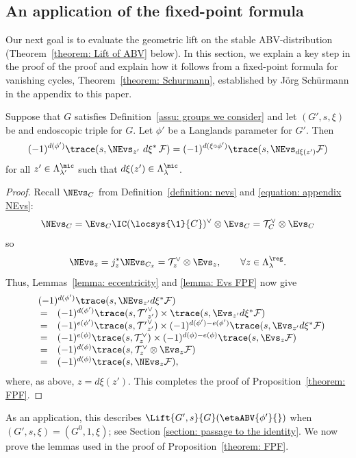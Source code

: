 \documentclass[11pt,letterpaper]{amsart}
\numberwithin{equation}{section}
\begin{document}
\subsection{An application of the fixed-point formula}\label{subsection: FPF}

Our next goal is to evaluate the geometric lift on the stable ABV-distribution (Theorem~\ref{theorem: Lift of ABV} below). In this section, we explain a key step in the proof of the proof and explain how it follows from a fixed-point formula for vanishing cycles, Theorem~\ref{theorem: Schurmann}, established by Jörg Schürmann in the appendix to this paper.

\begin{proposition}\label{theorem: FPF}
Suppose that $G$ satisfies Definition~\ref{assu: groups we consider} and let $(G',s,\xi)$ be and endoscopic triple for $G$.
Let $\phi'$ be a Langlands parameter for $G'$.
Then
\[
(-1)^{d(\phi')} \trace({s},\NEvs_{z'}\ d\xi^*\, \mathcal{F})
=
(-1)^{d(\xi\circ\phi')}
\trace({s},\NEvs_{d\xi(z')} \mathcal{F})
\] 
for all $z'\in \Lambda^\mic_{\lambda'}$ such that $d\xi(z')\in \Lambda^\mic_{\lambda}$.
\end{proposition}

\begin{proof}
Recall $\NEvs_{C}$ from Definition~\ref{definition: nevs} and \eqref{equation: appendix NEvs}:
\[
\NEvs_{C} = \Evs_{C}\IC(\locsys{\1}{C})^\vee \otimes \Evs_{C} = \mathcal{T}_{C}^\vee\otimes \Evs_{C}
\]
so
\[
\NEvs_{z} = j_{z}^* \NEvs_{C_x} = \mathcal{T}_{z}^\vee \otimes \Evs_{z}, 
\qquad
\forall z\in \Lambda^\reg_{\lambda}.
\]
Thus, Lemmas~\ref{lemma: eccentricity} and \ref{lemma: Evs FPF} now give
\[
\begin{array}{rcl}
&& \hskip-20pt (-1)^{d(\phi')}
\trace(s,\NEvs_{z'}d\xi^*\mathcal{F}) \\
&=&
(-1)^{d(\phi')}
\trace(s,\mathcal{T'}^\vee_{z'})\times \trace(s, \Evs_{z'} d\xi^*\mathcal{F})\\
&=&
(-1)^{e(\phi')}
\trace(s,\mathcal{T'}^\vee_{z'})\times 
(-1)^{d(\phi')-e(\phi')} \trace(s, \Evs_{z'} d\xi^*\mathcal{F})\\
&=&
(-1)^{e(\phi)}
\trace(s,\mathcal{T}^\vee_{z})\times 
(-1)^{d(\phi)-e(\phi)} \trace(s, \Evs_{z} \mathcal{F})\\
&=&
(-1)^{d(\phi)}
\trace(s,\mathcal{T}^\vee_{z}\otimes \Evs_{z} \mathcal{F})\\
&=&
(-1)^{d(\phi)}
\trace(s,\NEvs_{z} \mathcal{F}),
\end{array}
\]
where, as above, $z = d\xi(z')$.
This completes the proof of Proposition~\ref{theorem: FPF}. 
\end{proof}
As an application, this describes $\Lift{G',s}{G}(\etaABV{\phi'}{})$ when $(G',s,\xi)= (G^0, 1,\xi)$; see Section \ref{section: passage to the identity}.
We now prove the lemmas used in the proof of Proposition~\ref{theorem: FPF}.
\end{document}
